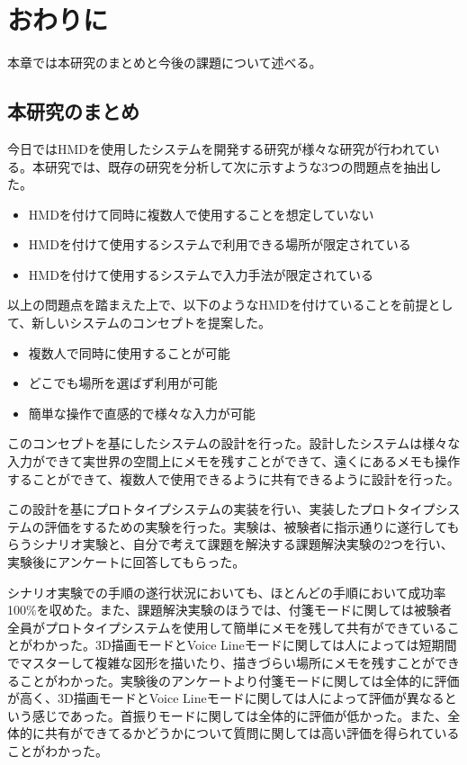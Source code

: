 \documentclass[11pt,a4j, titlepage]{jarticle} %
\begin{document}
\newpage
\section{おわりに}
本章では本研究のまとめと今後の課題について述べる。

\subsection{本研究のまとめ}
今日ではHMDを使用したシステムを開発する研究が様々な研究が行われている。本研究では、既存の研究を分析して次に示すような3つの問題点を抽出した。

\begin{itemize}
	\item HMDを付けて同時に複数人で使用することを想定していない
        \item HMDを付けて使用するシステムで利用できる場所が限定されている
	\item HMDを付けて使用するシステムで入力手法が限定されている
\end{itemize}

以上の問題点を踏まえた上で、以下のようなHMDを付けていることを前提として、新しいシステムのコンセプトを提案した。

\begin{itemize}
	\item 複数人で同時に使用することが可能
        \item どこでも場所を選ばず利用が可能
	\item 簡単な操作で直感的で様々な入力が可能
\end{itemize}

このコンセプトを基にしたシステムの設計を行った。設計したシステムは様々な入力ができて実世界の空間上にメモを残すことができて、遠くにあるメモも操作することができて、複数人で使用できるように共有できるように設計を行った。

この設計を基にプロトタイプシステムの実装を行い、実装したプロトタイプシステムの評価をするための実験を行った。実験は、被験者に指示通りに遂行してもらうシナリオ実験と、自分で考えて課題を解決する課題解決実験の2つを行い、実験後にアンケートに回答してもらった。

シナリオ実験での手順の遂行状況においても、ほとんどの手順において成功率100\%を収めた。また、課題解決実験のほうでは、付箋モードに関しては被験者全員がプロトタイプシステムを使用して簡単にメモを残して共有ができていることがわかった。3D描画モードとVoice Lineモードに関しては人によっては短期間でマスターして複雑な図形を描いたり、描きづらい場所にメモを残すことができることがわかった。実験後のアンケートより付箋モードに関しては全体的に評価が高く、3D描画モードとVoice Lineモードに関しては人によって評価が異なるという感じであった。首振りモードに関しては全体的に評価が低かった。また、全体的に共有ができてるかどうかについて質問に関しては高い評価を得られていることがわかった。
\end{document}
